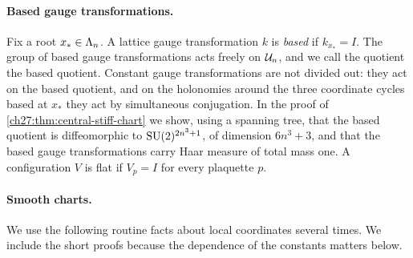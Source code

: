 \paragraph{Based gauge transformations.}
Fix a root $x_*\in\Lambda_{n}$. A lattice gauge transformation $k$ is \emph{based} if $k_{x_*}=I$. The group of based gauge transformations acts freely on $\mathcal U_{n}$, and we call the quotient the based quotient. Constant gauge transformations are not divided out: they act on the based quotient, and on the holonomies around the three coordinate cycles based at $x_*$ they act by simultaneous conjugation. In the proof of \cref{ch27:thm:central-stiff-chart} we show, using a spanning tree, that the based quotient is diffeomorphic to $\mathrm{SU}(2)^{2n^3+1}$, of dimension $6n^3+3$, and that the based gauge transformations carry Haar measure of total mass one. A configuration $V$ is flat if $V_p=I$ for every plaquette $p$.

\paragraph{Smooth charts.}
We use the following routine facts about local coordinates several times. We include the short proofs because the dependence of the constants matters below.

